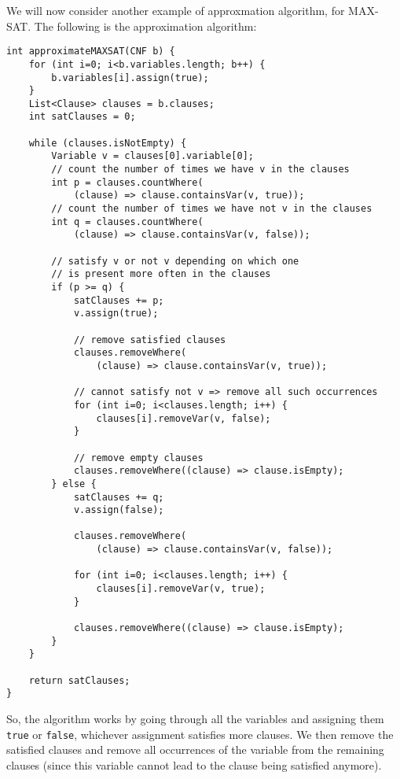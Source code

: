 \documentclass[a4paper, openany]{memoir}
\begin{document}
    We will now consider another example of approxmation algorithm, for MAX-SAT. The following is the approximation algorithm:
\begin{lstlisting}[language=pseudocode]
int approximateMAXSAT(CNF b) {
    for (int i=0; i<b.variables.length; b++) {
        b.variables[i].assign(true);
    }
    List<Clause> clauses = b.clauses;
    int satClauses = 0;

    while (clauses.isNotEmpty) {
        Variable v = clauses[0].variable[0];
        // count the number of times we have v in the clauses
        int p = clauses.countWhere(
            (clause) => clause.containsVar(v, true));
        // count the number of times we have not v in the clauses
        int q = clauses.countWhere(
            (clause) => clause.containsVar(v, false));
        
        // satisfy v or not v depending on which one 
        // is present more often in the clauses
        if (p >= q) {
            satClauses += p;
            v.assign(true);
            
            // remove satisfied clauses
            clauses.removeWhere(
                (clause) => clause.containsVar(v, true));
            
            // cannot satisfy not v => remove all such occurrences
            for (int i=0; i<clauses.length; i++) {
                clauses[i].removeVar(v, false);
            }
            
            // remove empty clauses
            clauses.removeWhere((clause) => clause.isEmpty);
        } else {
            satClauses += q;
            v.assign(false);

            clauses.removeWhere(
                (clause) => clause.containsVar(v, false));

            for (int i=0; i<clauses.length; i++) {
                clauses[i].removeVar(v, true);
            }
            
            clauses.removeWhere((clause) => clause.isEmpty);
        }
    }

    return satClauses;
}
\end{lstlisting}
    So, the algorithm works by going through all the variables and assigning them \texttt{true} or \texttt{false}, whichever assignment satisfies more clauses. We then remove the satisfied clauses and remove all occurrences of the variable from the remaining clauses (since this variable cannot lead to the clause being satisfied anymore).
    
\end{document}
